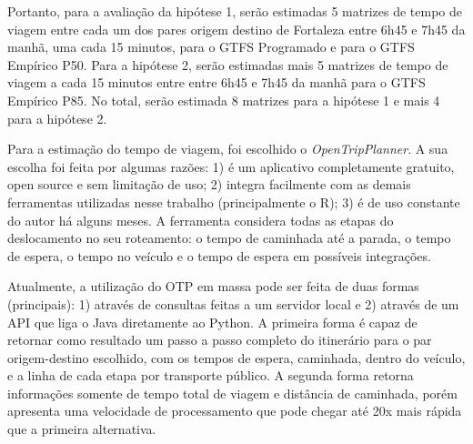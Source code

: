 \documentclass[        
    a4paper,          %
    12pt,             %
    chapter=TITLE,    %
    section=Title,    %
    subsection=Title, %
    oneside,          %
    english,          %
    spanish,          %
    brazil,           %
    fleqn             %
]{abntex2}
\begin{document}
  \begin{figure}[!h]
  \captionsetup{width=16cm}
  \centering
  \end{figure}
  
  Portanto, para a avaliação da hipótese 1, serão estimadas 5 matrizes de tempo de viagem entre cada um dos pares origem destino de Fortaleza entre 6h45 e 7h45 da manhã, uma cada 15 minutos, para o GTFS Programado e para o GTFS Empírico P50. Para a hipótese 2, serão estimadas mais 5 matrizes de tempo de viagem a cada 15 minutos entre entre 6h45 e 7h45 da manhã para o GTFS Empírico P85. No total, serão estimada 8 matrizes para a hipótese 1 e mais 4 para a hipótese 2.
  
  Para a estimação do tempo de viagem, foi escolhido o \emph{OpenTripPlanner}. A sua escolha foi feita por algumas razões: 1) é um aplicativo completamente gratuito, open source e sem limitação de uso; 2) integra facilmente com as demais ferramentas utilizadas nesse trabalho (principalmente o R); 3) é de uso constante do autor há alguns meses. A ferramenta considera todas as etapas do deslocamento no seu roteamento: o tempo de caminhada até a parada, o tempo de espera, o tempo no veículo e o tempo de espera em possíveis integrações.
  
  Atualmente, a utilização do OTP em massa pode ser feita de duas formas (principais): 1) através de consultas feitas a um servidor local e 2) através de um API que liga o Java diretamente ao Python. A primeira forma é capaz de retornar como resultado um passo a passo completo do itinerário para o par origem-destino escolhido, com os tempos de espera, caminhada, dentro do veículo, e a linha de cada etapa por transporte público. A segunda forma retorna informações somente de tempo total de viagem e distância de caminhada, porém apresenta uma velocidade de processamento que pode chegar até 20x mais rápida que a primeira alternativa.
  
\end{document}
